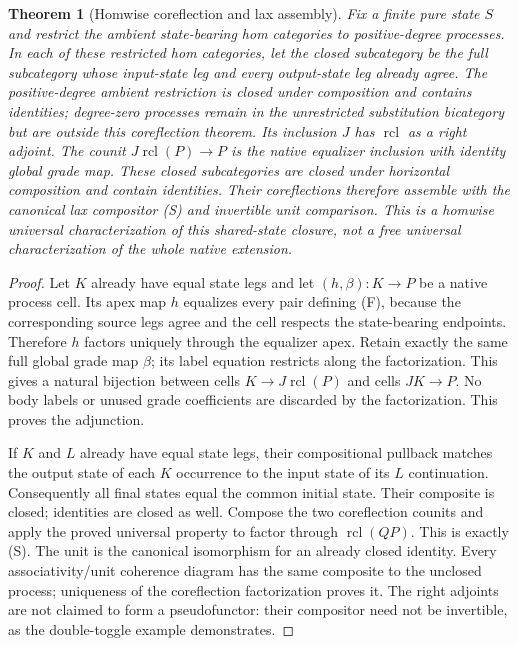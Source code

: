 \documentclass[11pt]{article}
\newtheorem{theorem}{Theorem}\newtheorem{proposition}[theorem]{Proposition}
\begin{document}
\begin{theorem}[Homwise coreflection and lax assembly]
Fix a finite pure state $S$ and restrict the ambient state-bearing hom categories to positive-degree processes. In each of these restricted hom categories, let the closed subcategory be the full subcategory whose input-state leg and every output-state leg already agree. The positive-degree ambient restriction is closed under composition and contains identities; degree-zero processes remain in the unrestricted substitution bicategory but are outside this coreflection theorem. Its inclusion $J$ has $\operatorname{rcl}$ as a right adjoint. The counit $J\operatorname{rcl}(P)\to P$ is the native equalizer inclusion with identity global grade map. These closed subcategories are closed under horizontal composition and contain identities. Their coreflections therefore assemble with the canonical lax compositor (S) and invertible unit comparison. This is a homwise universal characterization of this shared-state closure, not a free universal characterization of the whole native extension.
\end{theorem}
\begin{proof}
Let $K$ already have equal state legs and let $(h,\beta):K\to P$ be a native process cell. Its apex map $h$ equalizes every pair defining (F), because the corresponding source legs agree and the cell respects the state-bearing endpoints. Therefore $h$ factors uniquely through the equalizer apex. Retain exactly the same full global grade map $\beta$; its label equation restricts along the factorization. This gives a natural bijection between cells $K\to J\operatorname{rcl}(P)$ and cells $JK\to P$. No body labels or unused grade coefficients are discarded by the factorization. This proves the adjunction.

If $K$ and $L$ already have equal state legs, their compositional pullback matches the output state of each $K$ occurrence to the input state of its $L$ continuation. Consequently all final states equal the common initial state. Their composite is closed; identities are closed as well. Compose the two coreflection counits and apply the proved universal property to factor through $\operatorname{rcl}(QP)$. This is exactly (S). The unit is the canonical isomorphism for an already closed identity. Every associativity/unit coherence diagram has the same composite to the unclosed process; uniqueness of the coreflection factorization proves it. The right adjoints are not claimed to form a pseudofunctor: their compositor need not be invertible, as the double-toggle example demonstrates.
\end{proof}
\end{document}

